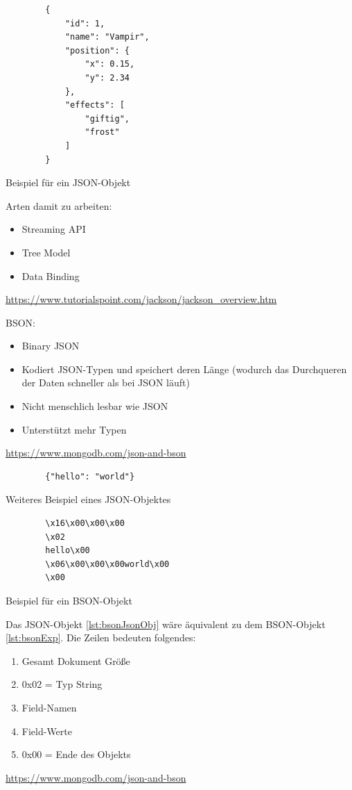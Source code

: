 \begin{listing}[htp]
    \begin{verbatim}
        {
            "id": 1,
            "name": "Vampir",
            "position": {
                "x": 0.15,
                "y": 2.34
            },
            "effects": [
                "giftig", 
                "frost"
            ]
        }
    \end{verbatim}
    \caption{Beispiel für ein JSON-Objekt}
    \label{lst:jsonExp}
\end{listing}

Arten damit zu arbeiten:
\begin{itemize}
    \item Streaming API
    \item Tree Model
    \item Data Binding
\end{itemize}
\url{https://www.tutorialspoint.com/jackson/jackson_overview.htm}

BSON:
\begin{itemize}
    \item Binary JSON
    \item Kodiert JSON-Typen und speichert deren Länge (wodurch das Durchqueren der Daten schneller als bei JSON läuft)
    \item Nicht menschlich lesbar wie JSON
    \item Unterstützt mehr Typen
\end{itemize}
\url{https://www.mongodb.com/json-and-bson}

\begin{listing}[htp]
    \begin{verbatim}
        {"hello": "world"}
    \end{verbatim}
    \caption{Weiteres Beispiel eines JSON-Objektes}
    \label{lst:bsonJsonObj}
\end{listing} 

\begin{listing}[htp]
    \begin{verbatim} 
        \x16\x00\x00\x00           
        \x02                      
        hello\x00                  
        \x06\x00\x00\x00world\x00  
        \x00                       
    \end{verbatim}
    \caption{Beispiel für ein BSON-Objekt}
    \label{lst:bsonExp}
\end{listing}

Das JSON-Objekt \ref{lst:bsonJsonObj} wäre äquivalent zu dem BSON-Objekt \ref{lst:bsonExp}. Die Zeilen bedeuten folgendes:
\begin{enumerate}
    \item Gesamt Dokument Größe
    \item 0x02 = Typ String
    \item Field-Namen
    \item Field-Werte
    \item 0x00 = Ende des Objekts
\end{enumerate}
\url{https://www.mongodb.com/json-and-bson} %

